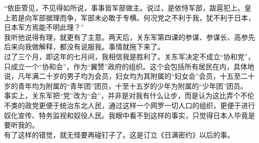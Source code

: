 “依臣管见，不见得如所说，事事皆军部做主。说过，是依恃军部，跋扈犯上。皇上若是向军部据理而争，军部未必敢于专横。何况党之不利于我，犹不利于日本，日本军方焉能不明此理？”\\

我听他说得有理，就更有了主意。两天后，关东军第四课的参谋、参谋长、高参先后来向我做解释，都没有说服我。事情就拖下来了。\\

过了三个月，即这年的七月间，我相信我是胜利了。关东军决定不成立“协和党”，只成立一个“协和会”，作为“翼赞”政府的组织。这个会包括所有居民在内，具体地说，凡年满二十岁的男子均为会员，妇女均为其附属的“妇女会”会员，十五至二十岁的青年均为附属的“青年团”团员，十至十五岁的少年为附属的“少年团”团员。\\

事实上，关东军把“党”改为“会”，并非是对我有什么让步，而是认为这比弄个不伦不类的政党更便于统治东北人民，通过这样一个网罗一切人口的组织，更便于进行奴化宣传、特务监视和奴役人民。我眼中看不到这样的事实，只觉得日本人毕竟是要听我的。\\

有了这样的错觉，就无怪要再碰钉子了。这是订立《日满密约》以后的事。
